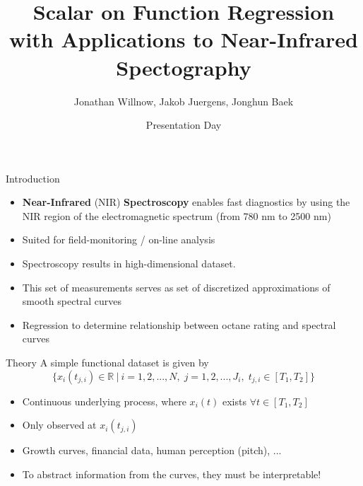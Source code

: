 \documentclass{beamer}
\title{Scalar on Function Regression \\
with Applications to Near-Infrared Spectography}
\author{Jonathan Willnow, Jakob Juergens, Jonghun Baek}
\date{{\color{red}}Presentation Day}
\begin{document}
	
	\begin{frame}
		\titlepage 
	\end{frame}
	
	\logo{}
	
	
	\begin{frame}{Introduction}
	
		\begin{itemize}
			\item \textbf{Near-Infrared} (NIR) \textbf{Spectroscopy} enables fast diagnostics by using the NIR region of the electromagnetic spectrum (from 780 nm to 2500 nm)
			\item Suited for field-monitoring / on-line analysis
			\item Spectroscopy results in high-dimensional dataset.	
			\item This set of measurements serves as set of discretized approximations of smooth spectral curves
			\item Regression to determine relationship between octane rating and spectral curves
			\end{itemize}
	\end{frame}
	
	\begin{frame}{Theory}
		A simple functional dataset is given by 
		$$\{x_{i}(t_{j,i}) \in \mathbb{R} \: \vert \: i = 1,2,...,N, \; j = 1,2,..., J_i, \; t_{j,i} \in [T_1, T_2] \}$$
		
		\begin{itemize}
			\item Continuous underlying process, where $x_i(t)$ exists $\forall t \in [T_1, T_2]$
			\item Only observed at $x_{i}(t_{j,i})$
			\item Growth curves, financial data, human perception (pitch), ...
			\item To abstract information from the curves, they must be interpretable!
		\end{itemize}
	\end{frame}

\end{document}
